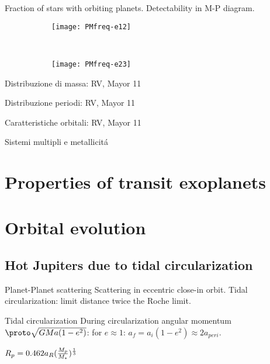 \begin{frame}{Fraction of stars with orbiting planets. Detectability in M-P diagram.}

\begin{figure}[!ht] \begin{subfigure}[b]{0.47\textwidth} \centering \texttt{[image: PMfreq-e12]}\label{fig:PMfreq-e12} \end{subfigure} ~ \begin{subfigure}[b]{0.47\textwidth} \centering \texttt{[image: PMfreq-e23]}\label{fig:PMfreq-e12}\end{subfigure} \end{figure} 


\end{frame}

\begin{frame}{Distribuzione di massa: RV, Mayor 11}

\end{frame}

\begin{frame}{Distribuzione periodi: RV, Mayor 11}

\end{frame}

\begin{frame}{Caratteristiche orbitali: RV, Mayor 11}

\end{frame}

\begin{frame}{Sistemi multipli e metallicit\'a}

\end{frame}

\section{Properties of transit exoplanets}

\section{Orbital evolution}

\subsection{Hot Jupiters due to tidal circularization}

\begin{frame}{Planet-Planet scattering}
Scattering in eccentric close-in orbit. Tidal circularization: limit distance twice the Roche limit.
\end{frame}

\begin{wordonframe}{Tidal circularization}
During circularization angular momentum $\proto \sqrt{GMa(1-e^2)}$: for $e\approx1$: $a_f=a_i(1-e^2)\approx2a_{peri}$.

$R_p=0.462a_R(\frac{M_p}{M_*})^{\frac{1}{3}}$ 
\end{wordonframe}
